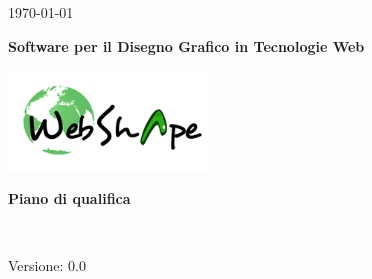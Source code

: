 
\title{\TITOLODOC}
\author{Piero Bizzotto}



\renewcommand{\insertversion}{0.0} %
\renewcommand{\TITOLODOC}{Piano di qualifica} %
\renewcommand{\glosspath}{.\glossario} %

\begin{titlepage}
\begin{center}
	\begin{Large}	\today \end{Large}
\end{center}

\vspace{20pt}

\begin{center}
	\begin{Huge}
				\textbf{\ajax}
	\end{Huge}
\end{center}			

\begin{center}
	\begin{large}
				\textbf{Software per il Disegno Grafico in Tecnologie Web}
	\end{large}
\end{center}			

\vspace{20pt}

\begin{center}
\includegraphics[width=150pt]{../logo/logo}
\end{center}

\vspace{170pt}
\begin{center} %
	\begin{Huge}
				\textbf{\TITOLODOC}
	\end{Huge}
			\\
\end{center}
\vspace{210pt}
\begin{center}
Versione: \insertversion
\end{center}
\end{titlepage}

